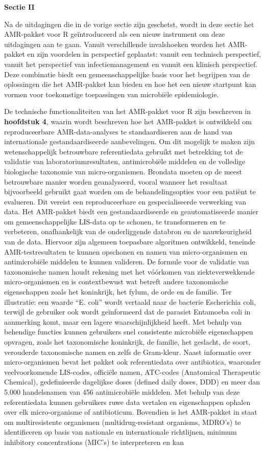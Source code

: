 \documentclass[
]{book}
\begin{document}
\textbf{Sectie II}

Na de uitdagingen die in de vorige sectie zijn geschetst, wordt in deze sectie het AMR-pakket voor R geïntroduceerd als een nieuw instrument om deze uitdagingen aan te gaan. Vanuit verschillende invalshoeken worden het AMR-pakket en zijn voordelen in perspectief geplaatst: vanuit een technisch perspectief, vanuit het perspectief van infectiemanagement en vanuit een klinisch perspectief. Deze combinatie biedt een gemeenschappelijke basis voor het begrijpen van de oplossingen die het AMR-pakket kan bieden en hoe het een nieuw startpunt kan vormen voor toekomstige toepassingen van microbiële epidemiologie.

De technische functionaliteiten van het AMR-pakket voor R zijn beschreven in \textbf{hoofdstuk 4}, waarin wordt beschreven hoe het AMR-pakket is ontwikkeld om reproduceerbare AMR-data-analyses te standaardiseren aan de hand van internationale gestandaardiseerde aanbevelingen. Om dit mogelijk te maken zijn wetenschappelijk betrouwbare referentiedata gebruikt met betrekking tot de validatie van laboratoriumresultaten, antimicrobiële middelen en de volledige biologische taxonomie van micro-organismen. Brondata moeten op de meest betrouwbare manier worden geanalyseerd, vooral wanneer het resultaat bijvoorbeeld gebruikt gaat worden om de behandelingsopties voor een patiënt te evalueren. Dit vereist een reproduceerbare en gespecialiseerde verwerking van data. Het AMR-pakket biedt een gestandaardiseerde en geautomatiseerde manier om gemeenschappelijke LIS-data op te schonen, te transformeren en te verbeteren, onafhankelijk van de onderliggende databron en de nauwkeurigheid van de data. Hiervoor zijn algemeen toepasbare algoritmen ontwikkeld, teneinde AMR-testresultaten te kunnen opschonen en namen van micro-organismen en antimicrobiële middelen te kunnen valideren. De formule voor de validatie van taxonomische namen houdt rekening met het vóórkomen van ziekteverwekkende micro-organismen en is contextbewust wat betreft andere taxonomische eigenschappen zoals het koninkrijk, het fylum, de orde en de familie. Ter illustratie: een waarde ``E. coli'' wordt vertaald naar de bacterie Escherichia coli, terwijl de gebruiker ook wordt geïnformeerd dat de parasiet Entamoeba coli in aanmerking komt, maar een lagere waarschijnlijkheid heeft. Met behulp van behendige functies kunnen gebruikers snel consistente microbiële eigenschappen opvragen, zoals het taxonomische koninkrijk, de familie, het geslacht, de soort, verouderde taxonomische namen en zelfs de Gram-kleur. Naast informatie over micro-organismen bevat het pakket ook referentiedata over antibiotica, waaronder veelvoorkomende LIS-codes, officiële namen, ATC-codes (Anatomical Therapeutic Chemical), gedefinieerde dagelijkse doses (defined daily doses, DDD) en meer dan 5.000 handelsnamen van 456 antimicrobiële middelen. Met behulp van deze referentiedata kunnen gebruikers ruwe data vertalen en eigenschappen ophalen over elk micro-organisme of antibioticum. Bovendien is het AMR-pakket in staat om multiresistente organismen (multidrug-resistant organisms, MDRO's) te identificeren op basis van nationale en internationale richtlijnen, minimum inhibitory concentrations (MIC's) te interpreteren en kan 
\end{document}
